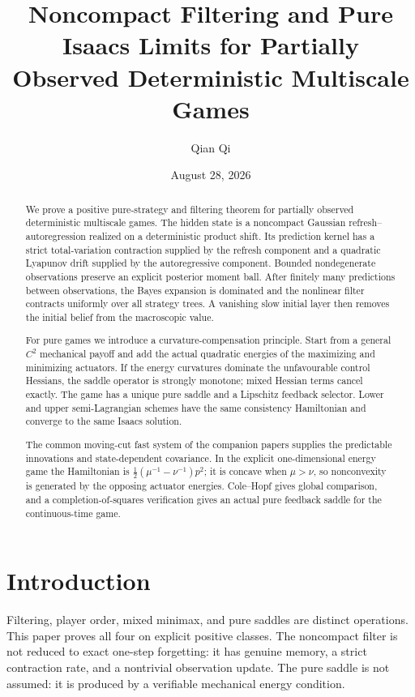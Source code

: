 \documentclass[11pt,reqno]{amsart}
\title[Filtering and pure Isaacs limits]{Noncompact Filtering and Pure Isaacs Limits for Partially Observed Deterministic Multiscale Games}
\author{Qian Qi}
\date{August 28, 2026}
\theoremstyle{definition}
\theoremstyle{remark}
\begin{document}
\begin{abstract}
We prove a positive pure-strategy and filtering theorem for partially observed
deterministic multiscale games.  The hidden state is a noncompact Gaussian
refresh--autoregression realized on a deterministic product shift.  Its
prediction kernel has a strict total-variation contraction supplied by the
refresh component and a quadratic Lyapunov drift supplied by the autoregressive
component.  Bounded nondegenerate observations preserve an explicit posterior
moment ball.  After finitely many predictions between observations, the Bayes
expansion is dominated and the nonlinear filter contracts uniformly over all
strategy trees.  A vanishing slow initial layer then removes the initial belief
from the macroscopic value.

For pure games we introduce a curvature-compensation principle.  Start from a
general $C^2$ mechanical payoff and add the actual quadratic energies of the
maximizing and minimizing actuators.  If the energy curvatures dominate the
unfavourable control Hessians, the saddle operator is strongly monotone; mixed
Hessian terms cancel exactly.  The game has a unique pure saddle and a
Lipschitz feedback selector.  Lower and upper semi-Lagrangian schemes have the
same consistency Hamiltonian and converge to the same Isaacs solution.

The common moving-cut fast system of the companion papers supplies the
predictable innovations and state-dependent covariance.  In the explicit
one-dimensional energy game the Hamiltonian is
$\frac12(\mu^{-1}-\nu^{-1})p^2$; it is concave when $\mu>\nu$, so nonconvexity
is generated by the opposing actuator energies.  Cole--Hopf gives global
comparison, and a completion-of-squares verification gives an actual pure
feedback saddle for the continuous-time game.
\end{abstract}

\maketitle
\tableofcontents

\section{Introduction}

Filtering, player order, mixed minimax, and pure saddles are distinct
operations.  This paper proves all four on explicit positive classes.  The
noncompact filter is not reduced to exact one-step forgetting: it has genuine
memory, a strict contraction rate, and a nontrivial observation update.  The
pure saddle is not assumed: it is produced by a verifiable mechanical energy
condition.
\end{document}
